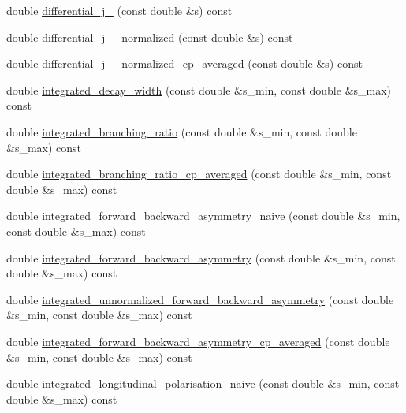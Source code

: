 \begin{DoxyCompactItemize}
\item 
double \hyperlink{classeos_1_1BToKstarDilepton_3_01LowRecoil_01_4_a04c77674ecd5e394bcc2524ae487ab8c}{differential\_\-j\_} (const double \&s) const 
\item 
double \hyperlink{classeos_1_1BToKstarDilepton_3_01LowRecoil_01_4_a7fbe7107a9bea09c9d68c83c24c3c2bc}{differential\_\-j\_\_\-normalized} (const double \&s) const 
\item 
double \hyperlink{classeos_1_1BToKstarDilepton_3_01LowRecoil_01_4_a58832a8a0e49a3c60e5064a91fcb4d1b}{differential\_\-j\_\_\-normalized\_\-cp\_\-averaged} (const double \&s) const 
\item 
double \hyperlink{classeos_1_1BToKstarDilepton_3_01LowRecoil_01_4_a503301f9de68d3c559706021fce6f213}{integrated\_\-decay\_\-width} (const double \&s\_\-min, const double \&s\_\-max) const 
\item 
double \hyperlink{classeos_1_1BToKstarDilepton_3_01LowRecoil_01_4_a58edd7101a9cb8aceb1f1ccfdd902b6b}{integrated\_\-branching\_\-ratio} (const double \&s\_\-min, const double \&s\_\-max) const 
\item 
double \hyperlink{classeos_1_1BToKstarDilepton_3_01LowRecoil_01_4_aa036cffb6a06b8b4a39dffebb2c6cb16}{integrated\_\-branching\_\-ratio\_\-cp\_\-averaged} (const double \&s\_\-min, const double \&s\_\-max) const 
\item 
double \hyperlink{classeos_1_1BToKstarDilepton_3_01LowRecoil_01_4_a05e129e772037a0775b5a27bcba4ee9e}{integrated\_\-forward\_\-backward\_\-asymmetry\_\-naive} (const double \&s\_\-min, const double \&s\_\-max) const 
\item 
double \hyperlink{classeos_1_1BToKstarDilepton_3_01LowRecoil_01_4_ae8f3b8edaa430209c09bd473bdf0d43a}{integrated\_\-forward\_\-backward\_\-asymmetry} (const double \&s\_\-min, const double \&s\_\-max) const 
\item 
double \hyperlink{classeos_1_1BToKstarDilepton_3_01LowRecoil_01_4_aa0434ade7047a9b415411fc7649668cb}{integrated\_\-unnormalized\_\-forward\_\-backward\_\-asymmetry} (const double \&s\_\-min, const double \&s\_\-max) const 
\item 
double \hyperlink{classeos_1_1BToKstarDilepton_3_01LowRecoil_01_4_a9d215ad72958a94dd32cd6bd2538486a}{integrated\_\-forward\_\-backward\_\-asymmetry\_\-cp\_\-averaged} (const double \&s\_\-min, const double \&s\_\-max) const 
\item 
double \hyperlink{classeos_1_1BToKstarDilepton_3_01LowRecoil_01_4_acafbe819d47149274cc6337044c50c29}{integrated\_\-longitudinal\_\-polarisation\_\-naive} (const double \&s\_\-min, const double \&s\_\-max) const 

\end{DoxyCompactItemize}
